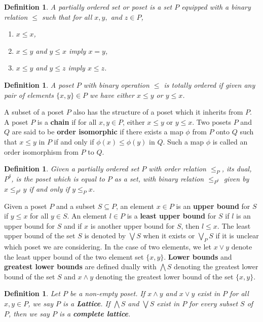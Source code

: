 \documentclass[psamsfonts]{amsart}
\numberwithin{equation}{subsection}
\theoremstyle{plain}
\newtheorem{definition}[theorem]{Definition}
\theoremstyle{definition}
\theoremstyle{remark}
\begin{document}
\begin{definition}
 A partially ordered set or poset  is a set $P$ equipped with a binary relation $\leq$ such that for all $x, y, $ and $z \in P$,
\begin{enumerate}
\item $x \leq x$,
\item $x \leq y$ and $y \leq x$ imply $x = y$,
\item $x \leq y$ and $y \leq z$ imply $x \leq z$. 
\end{enumerate}
\end{definition}

\begin{definition} A poset $P$ with binary operation $\leq$ is totally ordered if given any  pair of elements $\{x, y \} \in P$ we have either $x \leq y$ or $y \leq x$.  
\end{definition}
A subset of a poset $P$ also has the structure of a poset  which it inherits from $P$. A poset $P$ is a {\bf chain} if for all $x, y \in P$, 
either $x \leq y$ or $y \leq x$.  Two posets $P$ and $Q$ are said to be {\bf order isomorphic}  if there exists a map $\phi$ from $P$ onto $Q$ 
such that $x \leq y$ in $P$ if and only if  $\phi(x) \leq \phi(y)$ in $Q$. Such a map $\phi$ is called an order isomorphism from $P$ to $Q$. 
\begin{definition}
Given a partially  ordered set $P$ with order relation $\leq_{P}$, its dual, $P^{\delta}$, is the poset which is equal to $P$ as a set, with binary relation 
$\leq_{P^{\delta}}$ given by 
$x \leq_{P^{\delta}} y$  if and only if $y \leq_{P} x$. 
\end{definition}

Given a poset $P$ and a subset $S \subseteq P$, an element $x \in P$ is an {\bf upper bound}  for $S$  if $y \leq x$ for all $y \in S$.  An element 
$l \in P$ is a {\bf least upper bound}  for $S$ if $l$ is an upper bound for $S$ and if $x$ is another upper bound for $S$, then $l \leq x$. 
The least upper bound of 
the set $S$ is denoted by $\bigvee S$ when it exists or $\bigvee_P S$ if it is unclear which poset we are considering. In the case of two elements, we let $x \vee y$ denote 
the least upper  bound of the two element set $\{x, y\}$. 
{\bf Lower bounds } and 
{\bf greatest lower bounds}  are defined dually with $\bigwedge S$ denoting the greatest lower bound of the set $S$ and $x \wedge y$ denoting the 
greatest lower bound of the set $\{x, y\}$. 

\begin{definition}
Let $P$ be a non-empty poset. If $x\wedge y$ and $x \vee y$ exist in $P$ for all $x, y \in P$, we say $P$ is a {\bf Lattice}. If $\bigwedge S$ and $\bigvee S$ exist in $P$ 
for every subset  $S$ of $P$, then we say $P$ is a {\bf complete lattice}. 
\end{definition}
\end{document}
